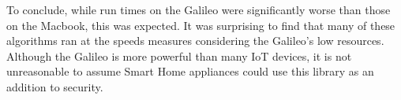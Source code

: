 To conclude, while run times on the Galileo were significantly worse than those on the Macbook, this was expected.  It was surprising to find that many of these algorithms ran at the speeds measures considering the Galileo's low resources. Although the Galileo is more powerful than many IoT devices, it is not unreasonable to assume Smart Home appliances could use this library as an addition to security.
